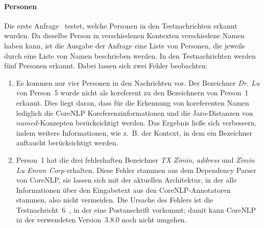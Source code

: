 \paragraph{Personen}
Die erste Anfrage~ testet, welche Personen in den Testnachrichten erkannt wurden.
Da dieselbe Person in verschiedenen Kontexten verschiedene Namen haben kann, ist die Ausgabe der Anfrage eine Liste von Personen, die jeweils durch eine Liste von Namen beschrieben werden.
In den Testnachrichten werden fünf Personen erkannt.
Dabei lassen sich zwei Fehler beobachten:
\begin{enumerate}
	\item Es kommen nur vier Personen in den Nachrichten vor.
		Der Bezeichner \textit{Dr. Lu} von Person~5 wurde nicht als koreferent zu den Bezeichnern von Person~1 erkannt. %
		Dies liegt daran, dass für die Erkennung von koreferenten Namen lediglich die CoreNLP Koreferenzinformationen und die Jaro-Distanzen von $named$-Konzepten berücksichtigt werden.
		Das Ergebnis ließe sich verbessern, indem weitere Informationen, wie z.~B. der Kontext, in dem ein Bezeichner auftaucht berücksichtigt werden. \errorB\
	\item Person~1 hat die drei fehlerhaften Bezeichner \textit{TX Zimin}, \textit{address} und \textit{Zimin Lu Enron Corp} erhalten.
		Diese Fehler stammen aus dem Dependency Parser von CoreNLP, sie lassen sich mit der aktuellen Architektur, in der alle Informationen über den Eingabetext aus den CoreNLP-Annotatoren stammen, also nicht vermeiden.
		Die Ursache des Fehlers ist die Testnachricht~6~\tref{sec:appendix:msgs}, in der eine Postanschrift vorkommt;
		damit kann CoreNLP in der verwendeten Version~3.8.0 noch nicht umgehen. \errorA\
\end{enumerate}

